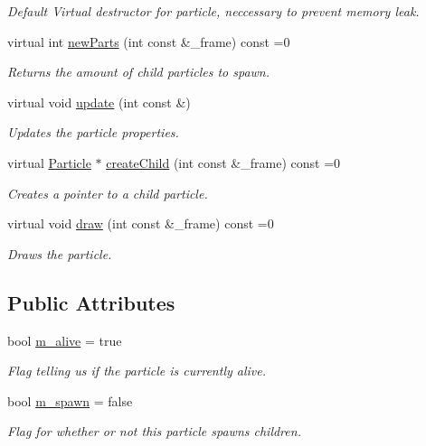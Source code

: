 \begin{DoxyCompactItemize}
\begin{DoxyCompactList}\small\item\em Default Virtual destructor for particle, neccessary to prevent memory leak. \end{DoxyCompactList}\item 
virtual int \hyperlink{classParticle_abbaa24710a9341fe90df0da7b96a4014}{new\-Parts} (int const \&\-\_\-frame) const =0
\begin{DoxyCompactList}\small\item\em Returns the amount of child particles to spawn. \end{DoxyCompactList}\item 
virtual void \hyperlink{classParticle_a842b0304310e8e8e92119563bbefe8a9}{update} (int const \&)
\begin{DoxyCompactList}\small\item\em Updates the particle properties. \end{DoxyCompactList}\item 
virtual \hyperlink{classParticle}{Particle} $\ast$ \hyperlink{classParticle_a3c7dcda6443a8cd16c142d6e712d3268}{create\-Child} (int const \&\-\_\-frame) const =0
\begin{DoxyCompactList}\small\item\em Creates a pointer to a child particle. \end{DoxyCompactList}\item 
virtual void \hyperlink{classParticle_a468fedc0c5773683ce0f14e7a906b184}{draw} (int const \&\-\_\-frame) const =0
\begin{DoxyCompactList}\small\item\em Draws the particle. \end{DoxyCompactList}\end{DoxyCompactItemize}
\subsection*{Public Attributes}
\begin{DoxyCompactItemize}
\item 
\hypertarget{classParticle_afa6c5fb980874037e2ce0971f678b44d}{bool \hyperlink{classParticle_afa6c5fb980874037e2ce0971f678b44d}{m\-\_\-alive} = true}\label{classParticle_afa6c5fb980874037e2ce0971f678b44d}

\begin{DoxyCompactList}\small\item\em Flag telling us if the particle is currently alive. \end{DoxyCompactList}\item 
\hypertarget{classParticle_a1f7c4f4c38aa28b135d3b1abce3c0c02}{bool \hyperlink{classParticle_a1f7c4f4c38aa28b135d3b1abce3c0c02}{m\-\_\-spawn} = false}\label{classParticle_a1f7c4f4c38aa28b135d3b1abce3c0c02}

\begin{DoxyCompactList}\small\item\em Flag for whether or not this particle spawns children. \end{DoxyCompactList}\end{DoxyCompactItemize}
